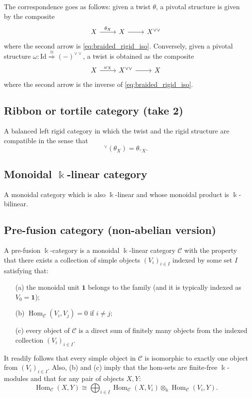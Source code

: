 \documentclass[11pt]{article}
\theoremstyle{definition}
\begin{document}
The correspondence goes as follows: given a twist $\theta$, a pivotal structure is given by the composite
$$ \begin{tikzcd}
    X \rar{\theta_X} & X \rar &X^{\vee \vee}
\end{tikzcd}  $$
where the second arrow is \eqref{eq:braided_rigid_iso}. Conversely, given a pivotal structure $\omega: \mathrm{Id} \overset{\cong}{\Longrightarrow} (-)^{\vee \vee}$, a twist is obtained as the composite
$$\begin{tikzcd}
    X \rar{\omega_X} & X^{\vee \vee} \rar& X
\end{tikzcd}$$
where the second arrow is the inverse of \eqref{eq:braided_rigid_iso}.

\subsection{Ribbon or tortile category (take 2)}
A balanced left rigid category in which the twist and the rigid structure are compatible in the sense that
\[ {}^\vee(\theta_X) = \theta_{{}^\vee X}. \]


\subsection{Monoidal \(\Bbbk\)-linear category}
A monoidal category which is also \( \Bbbk\)-linear and whose monoidal product is \( \Bbbk\)-bilinear.

\subsection{Pre-fusion category (non-abelian version)} 
A pre-fusion \( \Bbbk\)-category is a monoidal \( \Bbbk\)-linear category \( \mathcal{C} \) with the property that
there exists a collection of simple objects \( (V_i)_{i \in I} \) indexed by some set \( I \) satisfying that:
\begin{itemize}
    \item[(a)] the monoidal unit \( \mathbf{1} \) belongs to the family (and it is typically indexed as \( V_0 = \mathbf{1} \));
    \item[(b)] \( \operatorname{Hom}_{\mathcal{C}}(V_i, V_j) = 0 \) if \( i \neq j \);
    \item[(c)] every object of \( \mathcal{C} \) is a direct sum of finitely many objects from the indexed collection
    \( (V_i)_{i \in I} \).
\end{itemize}
It readily follows that every simple object in \( \mathcal{C} \) is isomorphic to exactly one object from
\( (V_i)_{i \in I} \). Also, (b) and (c) imply that the hom-sets are finite-free \( \Bbbk\)-modules and that
for any pair of objects \( X, Y \):
\[
\operatorname{Hom}_{\mathcal{C}}(X,Y) \cong \bigoplus_{i \in I} \operatorname{Hom}_{\mathcal{C}}(X,V_i)
\otimes_{\Bbbk} \operatorname{Hom}_{\mathcal{C}}(V_i,Y).
\]
\end{document}
